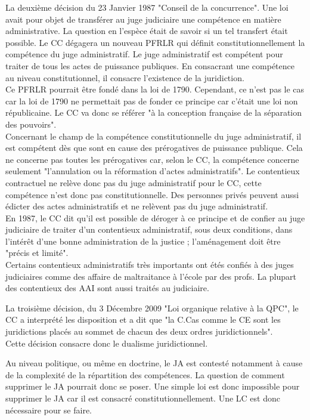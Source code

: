 \documentclass[10pt, a4paper, openany]{book}
\begin{document}
La deuxième décision du 23 Janvier 1987 "Conseil de la concurrence". Une loi avait pour objet de transférer au juge judiciaire une compétence en matière administrative. La question en l'espèce était de savoir si un tel transfert était possible. Le CC dégagera un nouveau PFRLR qui définit constitutionnellement la compétence du juge administratif. Le juge administratif est compétent pour traiter de tous les actes de puissance publiques. En consacrant une compétence au niveau constitutionnel, il consacre l'existence de la juridiction. \\
Ce PFRLR pourrait être fondé dans la loi de 1790. Cependant, ce n'est pas le cas car la loi de 1790 ne permettait pas de fonder ce principe car c'était une loi non républicaine. Le CC va donc se référer "à la conception française de la séparation des pouvoirs". \\
Concernant le champ de la compétence constitutionnelle du juge administratif, il est compétent dès que sont en cause des prérogatives de puissance publique. Cela ne concerne pas toutes les prérogatives car, selon le CC, la compétence concerne seulement "l'annulation ou la réformation d'actes administratifs". Le contentieux contractuel ne relève donc pas du juge administratif pour le CC, cette compétence n'est donc pas constitutionnelle. Des personnes privés peuvent aussi édicter des actes administratifs et ne relèvent pas du juge administratif. \\
En 1987, le CC dit qu'il est possible de déroger à ce principe et de confier au juge judiciaire de traiter d'un contentieux administratif, sous deux conditions, dans l'intérêt d'une bonne administration de la justice ; l'aménagement doit être "précis et limité". \\
Certains contentieux administratifs très importants ont étés confiés à des juges judiciaires comme des affaire de maltraitance à l'école par des profs. La plupart des contentieux des AAI sont aussi traités au judiciaire. 


La troisième décision, du 3 Décembre 2009 "Loi organique relative à la QPC", le CC a interprété les disposition et a dit que "la C.Cas comme le CE sont les juridictions placés au sommet de chacun des deux ordres juridictionnels". \\
Cette décision consacre donc le dualisme juridictionnel.


Au niveau politique, ou même en doctrine, le JA est contesté notamment à cause de la complexité de la répartition des compétences. La question de comment supprimer le JA pourrait donc se poser. Une simple loi est donc impossible pour supprimer le JA car il est consacré constitutionnellement. Une LC est donc nécessaire pour se faire. 
\end{document}
